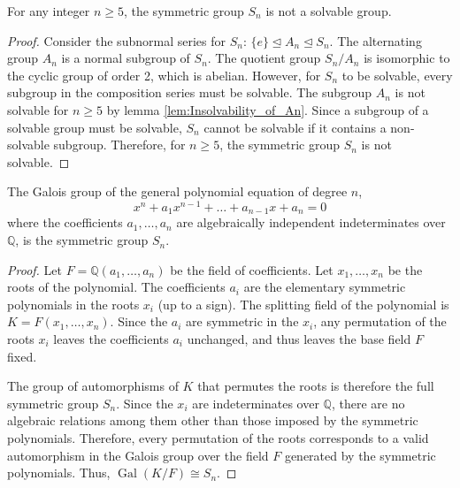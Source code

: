 \begin{lemma}
    \label{lem:Insolvability_of_Sn}
    For any integer $n \geq 5$, the symmetric group $S_n$ is not a solvable group.
\end{lemma}

\begin{proof}
    Consider the subnormal series for $S_n$: $\{e\} \trianglelefteq A_n \trianglelefteq S_n$. The alternating group $A_n$ is a normal subgroup of $S_n$. The quotient group $S_n / A_n$ is isomorphic to the cyclic group of order 2, which is abelian.
    However, for $S_n$ to be solvable, every subgroup in the composition series must be solvable. The subgroup $A_n$ is not solvable for $n \geq 5$ by lemma \ref{lem:Insolvability_of_An}. Since a subgroup of a solvable group must be solvable, $S_n$ cannot be solvable if it contains a non-solvable subgroup.
    Therefore, for $n \geq 5$, the symmetric group $S_n$ is not solvable.
\end{proof}

\begin{lemma}
    \label{lem:Galois_Group_of_General_Polynomial}
    The Galois group of the general polynomial equation of degree $n$,
    \[ x^n + a_1 x^{n-1} + \dots + a_{n-1}x + a_n = 0 \]
    where the coefficients $a_1, \dots, a_n$ are algebraically independent indeterminates over $\mathbb{Q}$, is the symmetric group $S_n$.
\end{lemma}

\begin{proof}
    Let $F = \mathbb{Q}(a_1, \dots, a_n)$ be the field of coefficients. Let $x_1, \dots, x_n$ be the roots of the polynomial. The coefficients $a_i$ are the elementary symmetric polynomials in the roots $x_i$ (up to a sign). The splitting field of the polynomial is $K = F(x_1, \dots, x_n)$. Since the $a_i$ are symmetric in the $x_i$, any permutation of the roots $x_i$ leaves the coefficients $a_i$ unchanged, and thus leaves the base field $F$ fixed.

    The group of automorphisms of $K$ that permutes the roots is therefore the full symmetric group $S_n$. Since the $x_i$ are indeterminates over $\mathbb{Q}$, there are no algebraic relations among them other than those imposed by the symmetric polynomials. Therefore, every permutation of the roots corresponds to a valid automorphism in the Galois group over the field $F$ generated by the symmetric polynomials. Thus, $\operatorname{Gal}(K/F) \cong S_n$.
\end{proof}

